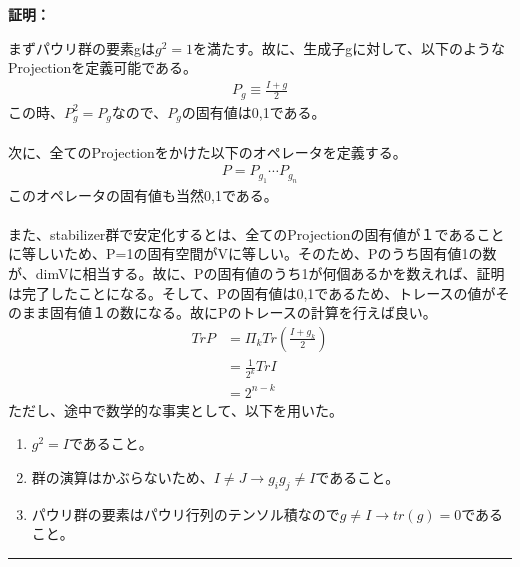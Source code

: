 \documentclass[a4paper,10.5pt]{article}
\numberwithin{equation}{section}
\newenvironment{proofbox}
{\begin{prooflabel}\textbf{証明：}\end{prooflabel}\vspace{0.8em}}
{\par\vspace{1em}\hrule\vspace{1em}}
\begin{document}
\begin{proofbox}
    まずパウリ群の要素gは$g^{2}=1$を満たす。故に、生成子gに対して、以下のようなProjectionを定義可能である。
    \begin{align*}
        P_{g}\equiv \frac{I+g}{2}
    \end{align*}
    この時、$P_{g}^{2}=P_{g}$なので、$P_{g}$の固有値は0,1である。\\
    \\
    次に、全てのProjectionをかけた以下のオペレータを定義する。
    \begin{align*}
        P=P_{g_{1}}\cdots P_{g_{n}}
    \end{align*}
    このオペレータの固有値も当然0,1である。\\
    \\
    また、stabilizer群で安定化するとは、全てのProjectionの固有値が１であることに等しいため、P=1の固有空間がVに等しい。そのため、Pのうち固有値1の数が、dimVに相当する。故に、Pの固有値のうち1が何個あるかを数えれば、証明は完了したことになる。そして、Pの固有値は0,1であるため、トレースの値がそのまま固有値１の数になる。故にPのトレースの計算を行えば良い。
    \begin{align*}
        TrP&=\Pi_{k}Tr(\frac{I+g_{k}}{2})\\
        &=\frac{1}{2^{k}}TrI\\
        &=2^{n-k}
    \end{align*}
    ただし、途中で数学的な事実として、以下を用いた。
    \begin{enumerate}
        \item $g^{2}=I$であること。
        \item 群の演算はかぶらないため、$I\neq J\to g_{i}g_{j}\neq I$であること。
        \item パウリ群の要素はパウリ行列のテンソル積なので$g\neq I \to tr(g)=0$であること。
    \end{enumerate}
    
\end{proofbox}
\end{document}
